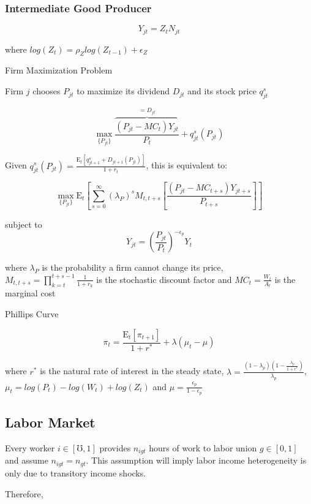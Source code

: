\documentclass[titlepage]{\econtex}\providecommand{\texname}{BufferStockTheory}
\begin{document}
\hypertarget{Intermediate Good Producer}{}
\subsubsection{Intermediate Good Producer}

$$Y_{jt} =  Z_{t}  N_{jt}$$ 

where $log(Z_{t}) = \rho_{Z} log( Z_{t-1}) + \epsilon_{Z}$


 Firm Maximization Problem
 
 Firm $j$ chooses $P_{jt}$ to maximize its dividend $D_{jt}$ and its stock price $q^{s}_{jt} $
 
 $$\max_{\{P_{jt}\}} \overbrace{\frac{(P_{jt} - MC_{t})Y_{jt}}{P_{t}}}^{=D_{jt}} + q^{s}_{jt}\left(P_{jt}\right) $$
 
Given $q^{s}_{jt}\left(P_{jt}\right) = \frac{\mathrm{E}_{t}\left[q^{s}_{jt+1} +D_{jt+1}\left(P_{jt}\right)\right]}{1+r_{t}}$, this is equivalent to: 
 
 $$\max_{\{P_{jt}\}} \mathrm{E}_{t}\left[\sum_{s=0}^{\infty} (\lambda_{P}) ^{s} M_{t,t+s} \left[ \frac{(P_{jt} - MC_{t+s})Y_{jt+s}}{P_{t+s}}\right]\right]$$
 
subject to $$Y_{jt} = \left(\frac {P_{jt}}{P_{t}}\right)^{- \epsilon_{p}} Y_{t}$$
 
where $ \lambda_{P}$ is the  probability a firm cannot change its price,  $M_{t, t+s} = \prod_{k=t}^{t+s-1} \frac{1}{1+r_{k}}$ is the stochastic discount factor and $MC_{t} = \frac{W_{t}}{A_{t}}$ is the marginal cost

Phillips Curve

$$ \pi_{t} = \frac{\mathrm{E}_{t}[\pi_{t+1}]}{1+r^{*}} + \lambda (\mu_{t}-\mu)$$

where $r^{*}$ is the natural rate of interest in the steady state, $\lambda = \frac{(1-\lambda_{p})(1-\frac{\lambda_{p}}{1+r^{*}})}{\lambda_{p}}$,  $ \mu_{t} = log(P_{t}) - log(W_{t}) + log(Z_{t})$ and $\mu = \frac{\epsilon_{p}}{1-\epsilon_{p}}$

\hypertarget{Labor Market}{}
\subsection{Labor Market}


Every worker $i \in [\mho,1]$ provides $n_{igt}$ hours of work to labor union $g \in [0,1]$ and assume $n_{igt} = \mathit{n}_{gt}$. This assumption will imply labor income heterogeneity is only due to transitory income shocks.

Therefore, 
\end{document}
